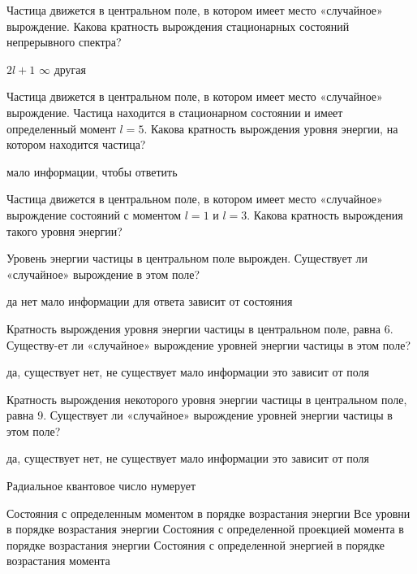 \documentclass[11pt,a4paper]{exam}
\begin{document}
\begin{questions}
\question Частица движется в центральном поле, в котором имеет место «случайное» вырождение. Какова кратность вырождения стационарных состояний непрерывного спектра?
\begin{choices}
\choice $2l + 1$    
\choice $\infty $         
\choice другая 
\end{choices}

\question Частица движется в центральном поле, в котором имеет место «случайное» вырождение. Частица находится в стационарном состоянии и имеет определенный момент $l = 5$. Какова кратность вырождения уровня энергии, на котором находится частица?
\begin{choices}
\choice мало информации, чтобы ответить 
\end{choices}

\question Частица движется в центральном поле, в котором имеет место «случайное» вырождение состояний с моментом $l = 1$ и $l = 3$. Какова кратность вырождения такого уровня энергии?
\begin{choices}
\end{choices}

\question Уровень энергии частицы в центральном поле вырожден. Существует ли «случайное» вырождение в этом поле?
\begin{choices}
\choice да    
\choice нет      
\choice мало информации для ответа    
\choice зависит от состояния
\end{choices}

\question Кратность вырождения уровня энергии частицы в центральном поле, равна 6. Существу-ет ли «случайное» вырождение уровней энергии частицы в этом поле?
\begin{choices}
\choice да, существует       
\choice нет, не существует
\choice мало информации      
\choice это зависит от поля
\end{choices}

\question Кратность вырождения некоторого уровня энергии частицы в центральном поле, равна 9. Существует ли «случайное» вырождение уровней энергии частицы в этом поле?
\begin{choices}
\choice да, существует       
\choice нет, не существует
\choice мало информации      
\choice это зависит от поля
\end{choices}

\question Радиальное квантовое число нумерует
\begin{choices}
\choice Состояния с определенным моментом в порядке возрастания энергии
\choice Все уровни в порядке возрастания энергии
\choice Состояния с определенной проекцией момента в порядке возрастания энергии
\choice Состояния с определенной энергией в порядке возрастания момента
\end{choices}


\end{questions}
\end{document}
